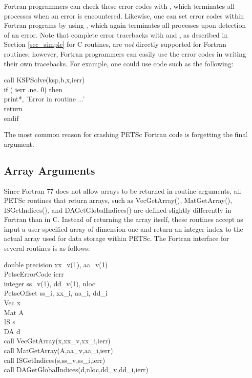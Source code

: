Fortran programmers
can check these error codes with
, which terminates all processes when an error is
encountered.  Likewise, one can set error codes within Fortran programs by
using , which again terminates all processes
upon detection of an error.  
Note that complete error tracebacks with
 and , as described in Section
\ref{sec_simple} for C routines, are {\em not} directly supported for
Fortran routines; however, Fortran programmers can easily use the
error codes in writing their own tracebacks.  For example, one could
use code such as the following:
\begin{tabbing}
   call KSPSolve(ksp,b,x,ierr)\\
   if ( ierr .ne. 0) then\\
       print*, 'Error in routine ...'\\
       return\\
   endif
\end{tabbing}

The most common reason for crashing PETSc Fortran code is forgetting the 
final  argument.

\subsection{Array Arguments}
\label{sec_fortranarrays}

Since Fortran 77 does not allow arrays to be returned in routine
arguments, all PETSc routines that return arrays, such as 
VecGetArray(), MatGetArray(), 
ISGetIndices(), and DAGetGlobalIndices()
are defined slightly differently in Fortran than in C.  
Instead of returning the array itself, these routines
accept as input a user-specified array of dimension one and return an
integer index to the actual array used for data storage within PETSc.
The Fortran interface for several routines is as follows:
\begin{tabbing}
   double precision xx\_v(1), aa\_v(1)\\
   PetscErrorCode ierr\\
   integer          ss\_v(1), dd\_v(1), nloc\\
   PetscOffset      ss\_i, xx\_i, aa\_i, dd\_i\\
   Vec x\\
   Mat A\\
   IS  s\\
   DA  d \\
 
   call VecGetArray(x,xx\_v,xx\_i,ierr)\\
   call MatGetArray(A,aa\_v,aa\_i,ierr)\\
   call ISGetIndices(s,ss\_v,ss\_i,ierr)\\
   call DAGetGlobalIndices(d,nloc,dd\_v,dd\_i,ierr)
\end{tabbing}

